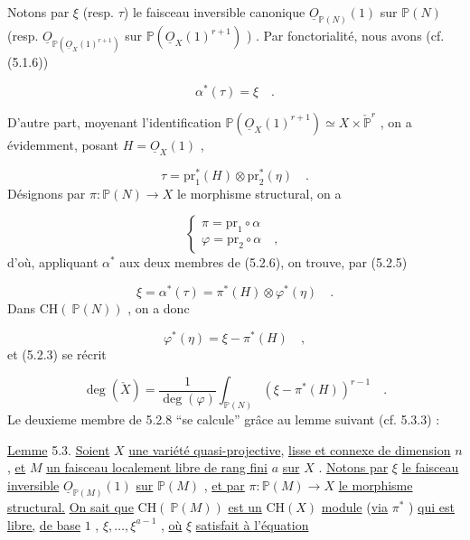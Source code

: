Notons par $\xi$ (resp. $\tau$) le faisceau inversible canonique $\underline{O}_{\mathbb{P}(N)}(1)$ sur $\mathbb{P}(N)$ (resp. $\underline{O}_{\mathbb{P}(\underline{O}_X(1)^{r+1})}$ sur $\mathbb{P}(\underline{O}_X(1)^{r+1})$ ) . Par fonctorialité, nous avons (cf. (5.1.6))

\begin{equation}\tag{5.2.5}
\alpha^*(\tau) = \xi \quad .
\end{equation}


D'autre part, moyenant l'identification $\mathbb{P}(\underline{O}_X(1)^{r+1}) \simeq X \times \check{\mathbb{P}}^r$ , on a évidemment, posant $H = \underline{O}_X(1)$ ,

\begin{equation}\tag{5.2.6}
\tau = \mathrm{pr}_1^*(H) \otimes \mathrm{pr}_2^*(\eta) \quad .
\end{equation}
Désignons par $\pi : \mathbb{P}(N) \longrightarrow X$ le morphisme structural, on a

\begin{equation*}
\begin{cases} \pi = \mathrm{pr}_1 \circ \alpha \\ \varphi = \mathrm{pr}_2 \circ \alpha \quad , \end{cases}
\end{equation*}
d'où, appliquant $\alpha^*$ aux deux membres de (5.2.6), on trouve, par (5.2.5)

\begin{equation}\tag{5.2.6}
\xi = \alpha^*(\tau) = \pi^*(H) \otimes \varphi^*(\eta) \quad .
\end{equation}
Dans $\mathrm{CH}(\ \mathbb{P}(N))$ , on a donc

\begin{equation}\tag{5.2.7}
\varphi^*(\eta) = \xi - \pi^*(H) \quad ,
\end{equation}
et (5.2.3) se récrit

\begin{equation}\tag{5.2.8}
\deg(\check{X}) = \frac{1}{\deg(\varphi)} \int_{\mathbb{P}(N)} (\xi - \pi^*(H))^{r-1} \quad .
\end{equation}
Le deuxieme membre de 5.2.8 ``se calcule'' grâce au lemme suivant (cf. 5.3.3) :

\underline{Lemme} 5.3. \underline{Soient} $X$ \underline{une variété quasi-projective}, \underline{lisse et connexe de dimension} $n$ , \underline{et} $M$ \underline{un faisceau  localement libre de rang fini} $a$ \underline{sur} $X$ . \underline{Notons par} $\xi$ \underline{le faisceau inversible} $\underline{O}_{\mathbb{P}(M)}(1)$ \underline{sur} $\mathbb{P}(M)$ ,
\underline{et par} $\pi : \mathbb{P}(M) \longrightarrow X$ \underline{le morphisme structural.} \underline{On sait que} $\mathrm{CH}(\ \mathbb{P}(M))$ \underline{est un} $\mathrm{CH}(X)$ \underline{module} (\underline{via} $\pi^*$ ) \underline{qui est libre,} \underline{de base} $1$ , $\xi, \ldots, \xi^{a-1}$ , \underline{où} $\xi$ \underline{satisfait à l'équation}


